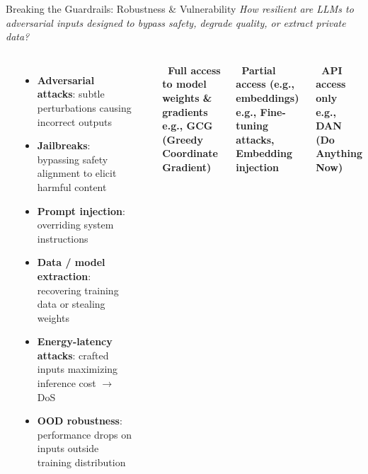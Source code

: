 \begin{frame}{Breaking the Guardrails: Robustness \& Vulnerability}
  {\footnotesize\itshape How resilient are LLMs to adversarial inputs designed to bypass safety, degrade quality, or extract private data?}
  \vspace{0.3em}

  \begin{columns}[T]
    {\small\bfseries{}}
    \begin{itemize}\scriptsize\setlength\itemsep{2pt}
      \item \textbf{Adversarial attacks}: subtle perturbations causing incorrect outputs
      \item \textbf{Jailbreaks}: bypassing safety alignment to elicit harmful content
      \item \textbf{Prompt injection}: overriding system instructions
      \item \textbf{Data / model extraction}: recovering training data or stealing weights
      \item \textbf{Energy-latency attacks}: crafted inputs maximizing inference cost $\to$ DoS
      \item \textbf{OOD robustness}: performance drops on inputs outside training distribution
    \end{itemize}

    {\small\bfseries{}}
    \vspace{0.3em}
    \begin{tcolorbox}[enhanced, colback=UCRlgray, colframe=UCRmgray,
        sharp corners, borderline west={3pt}{0pt}{UCRnavy},
        top=3pt, bottom=3pt]
      \footnotesize\bfseries{}
      \normalfont\ Full access to model weights \& gradients\\
      \scriptsize e.g., GCG (Greedy Coordinate Gradient)
    \end{tcolorbox}\vspace{2pt}
    \begin{tcolorbox}[enhanced, colback=UCRlgray, colframe=UCRmgray,
        sharp corners, borderline west={3pt}{0pt}{UCRnavy},
        top=3pt, bottom=3pt]
      \footnotesize\bfseries{}
      \normalfont\ Partial access (e.g., embeddings)\\
      \scriptsize e.g., Fine-tuning attacks, Embedding injection
    \end{tcolorbox}\vspace{2pt}
    \begin{tcolorbox}[enhanced, colback=UCRlgray, colframe=UCRmgray,
        sharp corners, borderline west={3pt}{0pt}{UCRnavy},
        top=3pt, bottom=3pt]
      \footnotesize\bfseries{}
      \normalfont\ API access only\\
      \scriptsize e.g., DAN (Do Anything Now)
    \end{tcolorbox}
  \end{columns}
\end{frame}


